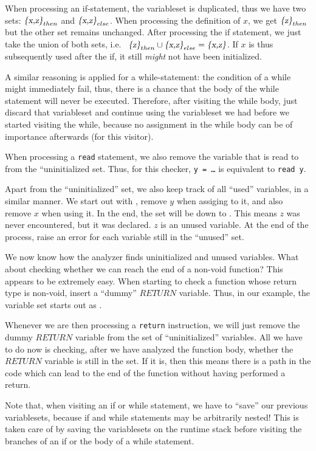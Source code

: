 \documentclass[a4paper]{article}
\begin{document}
When processing an if-statement, the variableset is duplicated, thus we have
two sets: $\textsl{\{x,z\}}_{then}$ and $\textsl{\{x,z\}}_{else}$. When processing the
definition of $x$, we get $\textsl{\{z\}}_{then}$ but the other set remains
unchanged. After processing the if statement, we just take the union of both
sets, i.e.~ $\textsl{\{z\}}_{then} \cup \textsl{\{x,z\}}_{else} = \textsl{\{x,z\}}$.
If $x$ is thus subsequently used after the if, it still \emph{might} not have
been initialized.

A similar reasoning is applied for a while-statement: the condition of a while
might immediately fail, thus, there is a chance that the body of the while
statement will never be executed. Therefore, after visiting the while body,
just discard that variableset and continue using the variableset we had before
we started visiting the while, because no assignment in the while body can be
of importance afterwards (for this visitor).

When processing a \texttt{read} statement, we also remove the variable that is
read to from the ``uninitialized set. Thus, for this checker,
\texttt{y = \ldots{}} is equivalent to \texttt{read y}.

Apart from the ``uninitialized'' set, we also keep track of all ``used''
variables, in a similar manner. We start out with , remove $y$
when assiging to it, and also remove $x$ when using it. In the end, the set
will be down to . This means $z$ was never encountered, but it was
declared. $z$ is an unused variable. At the end of the process, raise an error
for each variable still in the ``unused'' set.

We now know how the analyzer finds uninitialized and unused variables. What
about checking whether we can reach the end of a non-void function? This
appears to be extremely easy. When starting to check a function whose return
type is non-void, insert a ``dummy'' $RETURN$ variable. Thus, in our example,
the variable set starts out as .

Whenever we are then processing a \texttt{return} instruction, we will just
remove the dummy $RETURN$ variable from the set of ``uninitialized''
variables. All we have to do now is checking, after we have analyzed the
function body, whether the $RETURN$ variable is still in the set. If it is,
then this means there is a path in the code which can lead to the end of the
function without having performed a return.

Note that, when visiting an if or while statement, we have to ``save'' our
previous variablesets, because if and while statements may be arbitrarily
nested! This is taken care of by saving the variablesets on the runtime stack
before visiting the branches of an if or the body of a while statement.
\end{document}
